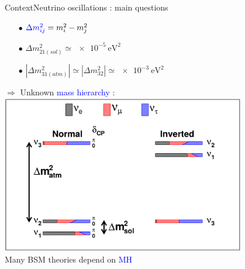 \documentclass[10pt]{beamer}
\begin{document}
\begin{frame}{Context}{Neutrino oscillations : main questions}
\begin{scriptsize}
\begin{minipage}{0.48\textwidth}
	    	\begin{itemize}
	    		\item[$\bullet$]$\textcolor{blue}{\Delta m_{ij}^2} = m_i^2-m_j^2$
	    		\item[$\bullet$] $\Delta m_{21(sol)}^2\simeq \SI{e-5}{\electronvolt\squared}$
	    		\item[$\bullet$] $|\Delta m_{31(atm)}^2| \simeq |\Delta m_{32}^2| \simeq \SI{e-3}{\electronvolt\squared}$
	    	\end{itemize}
	    	$\Rightarrow$ Unknown \textcolor{blue}{mass hierarchy} : \\
	    	\includegraphics[width=0.8\textwidth]{figures/contexte/mass_hierarchy.png}\\
	    	Many BSM theories depend on  \textcolor{blue}{MH}
	    \end{minipage}
	\end{scriptsize}
	    
    \end{frame}
    
\end{document}
